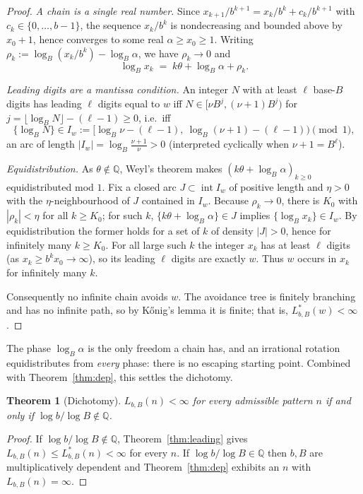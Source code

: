 \documentclass[11pt]{article}
\theoremstyle{plain}
\newtheorem{theorem}{Theorem}
\theoremstyle{definition}
\theoremstyle{remark}
\newcommand{\QQ}{\mathbb{Q}}
\newcommand{\Lbb}{L_{b,B}}
\begin{document}
\begin{proof}
\emph{A chain is a single real number.} Since $x_{k+1}/b^{k+1}=x_k/b^{k}+c_k/b^{k+1}$ with $c_k\in\{0,\dots,b-1\}$, the sequence $x_k/b^{k}$ is nondecreasing and bounded above by $x_0+1$, hence converges to some real $\alpha\ge x_0\ge1$. Writing $\rho_k:=\log_B(x_k/b^{k})-\log_B\alpha$, we have $\rho_k\to0$ and
\[
\log_B x_k \;=\; k\theta+\log_B\alpha+\rho_k .
\]

\emph{Leading digits are a mantissa condition.} An integer $N$ with at least $\ell$ base-$B$ digits has leading $\ell$ digits equal to $w$ iff $N\in[\nu B^{j},(\nu+1)B^{j})$ for $j=\lfloor\log_B N\rfloor-(\ell-1)\ge0$, i.e.\ iff
\[
\{\log_B N\}\in I_w:=\bigl[\log_B\nu-(\ell-1),\ \log_B(\nu+1)-(\ell-1)\bigr)\pmod1,
\]
an arc of length $|I_w|=\log_B\frac{\nu+1}{\nu}>0$ (interpreted cyclically when $\nu+1=B^{\ell}$).

\emph{Equidistribution.} As $\theta\notin\QQ$, Weyl's theorem makes $(k\theta+\log_B\alpha)_{k\ge0}$ equidistributed mod $1$. Fix a closed arc $J\subset\operatorname{int}I_w$ of positive length and $\eta>0$ with the $\eta$-neighbourhood of $J$ contained in $I_w$. Because $\rho_k\to0$, there is $K_0$ with $|\rho_k|<\eta$ for all $k\ge K_0$; for such $k$, $\{k\theta+\log_B\alpha\}\in J$ implies $\{\log_B x_k\}\in I_w$. By equidistribution the former holds for a set of $k$ of density $|J|>0$, hence for infinitely many $k\ge K_0$. For all large such $k$ the integer $x_k$ has at least $\ell$ digits (as $x_k\ge b^{k}x_0\to\infty$), so its leading $\ell$ digits are exactly $w$. Thus $w$ occurs in $x_k$ for infinitely many $k$.

Consequently no infinite chain avoids $w$. The avoidance tree is finitely branching and has no infinite path, so by K\H{o}nig's lemma it is finite; that is, $L^{*}_{b,B}(w)<\infty$.
\end{proof}

The phase $\log_B\alpha$ is the only freedom a chain has, and an irrational rotation equidistributes from \emph{every} phase: there is no escaping starting point. Combined with Theorem~\ref{thm:dep}, this settles the dichotomy.

\begin{theorem}[Dichotomy]\label{thm:dichotomy}
$\Lbb(n)<\infty$ for every admissible pattern $n$ \emph{if and only if} $\log b/\log B\notin\QQ$.
\end{theorem}

\begin{proof}
If $\log b/\log B\notin\QQ$, Theorem~\ref{thm:leading} gives $\Lbb(n)\le L^{*}_{b,B}(n)<\infty$ for every $n$. If $\log b/\log B\in\QQ$ then $b,B$ are multiplicatively dependent and Theorem~\ref{thm:dep} exhibits an $n$ with $\Lbb(n)=\infty$.
\end{proof}
\end{document}
